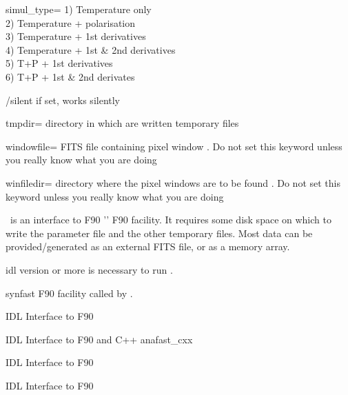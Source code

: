 \begin{keywords}
\begin{kwlist}{}
 \item[simul\_type=] 
        1) Temperature only \\
        2) Temperature + polarisation \\
        3) Temperature + 1st derivatives \\
        4) Temperature + 1st \& 2nd derivatives \\
        5) T+P + 1st derivatives \\
        6) T+P + 1st \& 2nd derivates

 \item[/silent]    if set, works silently

 \item[tmpdir=]      directory in which are written temporary files 

 \item[windowfile=]    FITS file containing pixel window 
        .
      Do not set this keyword unless you really know what you are doing

  \item[winfiledir=]     directory where the pixel windows are to be found 
        .
      Do not set this keyword unless you really know what you are doing

  \end{kwlist}
\end{keywords}  

\begin{codedescription}
{\thedocid\ is an interface to F90 '' F90 facility. It
requires some disk space on which to write the parameter file and the other
temporary files. Most data can be provided/generated as an external FITS
file, or as a memory array.}
\end{codedescription}



\begin{related}
  \begin{sulist}{} %
    \item[idl] version \idlversion or more is necessary to run \thedocid.
    \item[synfast] F90 facility called by \thedocid.
    \item[\htmlref{ialteralm}{idl:ialteralm}] IDL Interface to F90 
    \item[\htmlref{ianafast}{idl:ianafast}] IDL Interface to F90  and C++ anafast\_cxx
    \item[\htmlref{iprocess\_mask}{idl:iprocess_mask}] IDL Interface to F90 
    \item[\htmlref{ismoothing}{idl:ismoothing}] IDL Interface to F90 
 \end{sulist}
\end{related}

